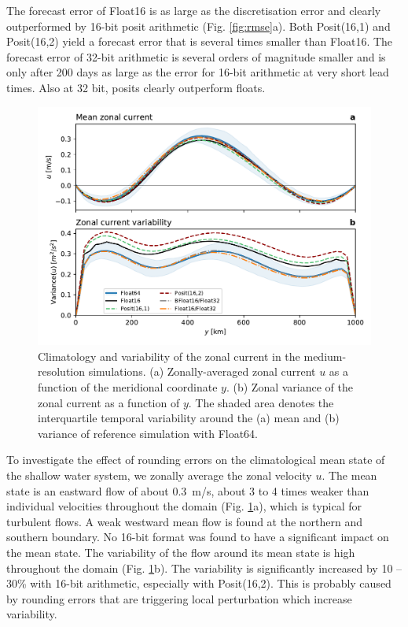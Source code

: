 \documentclass[draft]{agujournal2019}
\begin{document}
The forecast error of Float16 is as large as the discretisation error and clearly outperformed by 16-bit posit arithmetic (Fig. \ref{fig:rmse}a). Both Posit(16,1) and Posit(16,2) yield a forecast error that is several times smaller than Float16. The forecast error of 32-bit arithmetic is several orders of magnitude smaller and is only after 200 days as large as the error for 16-bit arithmetic at very short lead times. Also at 32 bit, posits clearly outperform floats.

\begin{figure}
\includegraphics[width=1\textwidth]{../plots/meanvar_u.pdf}
\caption{Climatology and variability of the zonal current in the medium-resolution simulations. (a) Zonally-averaged zonal current $u$ as a function of the meridional coordinate $y$. (b) Zonal variance of the zonal current as a function of $y$. The shaded area denotes the interquartile temporal variability around the (a) mean and (b) variance of reference simulation with Float64.}
\label{fig:mean}
\end{figure}

To investigate the effect of rounding errors on the climatological mean state of the shallow water system, we zonally average the zonal velocity $u$. The mean state is an eastward flow of about 0.3~m/s, about 3 to 4 times weaker than individual velocities throughout the domain (Fig. \ref{fig:mean}a), which is typical for turbulent flows. A weak westward mean flow is found at the northern and southern boundary. No 16-bit format was found to have a significant impact on the mean state. The variability of the flow around its mean state is high throughout the domain (Fig. \ref{fig:mean}b). The variability is significantly increased by 10 -- 30\% with 16-bit arithmetic, especially with Posit(16,2). This is probably caused by rounding errors that are triggering local perturbation which increase variability.
\end{document}
